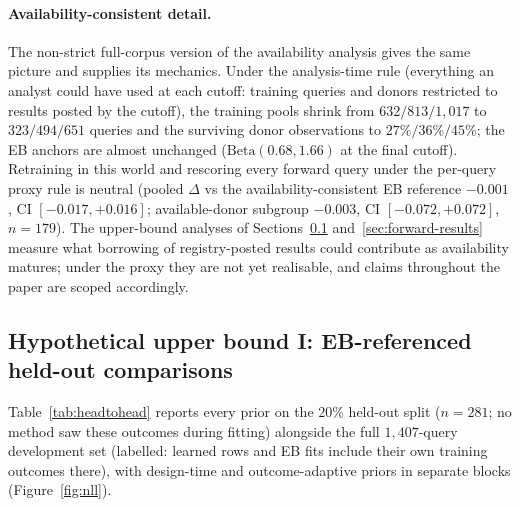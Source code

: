 \documentclass[11pt]{article}
\begin{document}
\paragraph{Availability-consistent detail.}
The non-strict full-corpus version of the availability analysis gives the
same picture and supplies its mechanics. Under
the analysis-time rule (everything an analyst could have used at each
cutoff: training queries and donors restricted to results posted by the
cutoff), the training pools shrink from $632/813/1{,}017$ to $323/494/651$
queries and the surviving donor observations to $27\%/36\%/45\%$; the EB
anchors are almost unchanged ($\mathrm{Beta}(0.68,1.66)$ at the final
cutoff). Retraining in this world and rescoring every forward query under
the per-query proxy rule is neutral (pooled $\Delta$ vs the
availability-consistent EB reference $-0.001$, CI $[-0.017,+0.016]$;
available-donor subgroup $-0.003$, CI $[-0.072,+0.072]$, $n=179$). The
upper-bound analyses of Sections~\ref{sec:headtohead-results}
and~\ref{sec:forward-results} measure what borrowing of registry-posted
results could contribute as availability matures; under the proxy they are
not yet realisable, and claims throughout the paper are scoped accordingly.

\subsection{Hypothetical upper bound I: EB-referenced held-out comparisons}
\label{sec:headtohead-results}
Table~\ref{tab:headtohead} reports every prior on the $20\%$ held-out split
($n = 281$; no method saw these outcomes during fitting) alongside the full
$1{,}407$-query development set (labelled: learned rows and EB fits include
their own training outcomes there), with design-time and outcome-adaptive
priors in separate blocks (Figure~\ref{fig:nll}).
\end{document}
